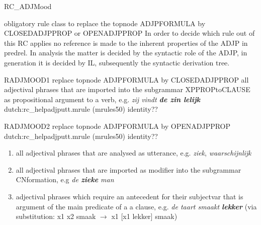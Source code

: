 \begin{mruleclass}{RC\_ADJMood}
\begin{classdescr}
\kind obligatory rule class
\classtask to replace the topnode ADJPFORMULA by CLOSEDADJPPROP or OPENADJPPROP
\classremarks 
In order to decide which rule out of this RC applies
no reference is made to the 
inherent properties of the ADJP in predrel.
In analysis the matter is decided by the syntactic role of the ADJP, in 
generation it is decided by IL, subsequently the syntactic derivation tree.
\nofilters

\nospeedrules

\noplannedrules

\norulesnotince


\end{classdescr}

\begin{members}
\begin{member}
 RADJMOOD1
 replace topnode ADJPFORMULA by CLOSEDADJPPROP
\example all adjectival phrases that are imported  into the subgrammar
XPPROPtoCLAUSE as propositional argument to a verb, e.g. {\em zij vindt {\bf 
de zin lelijk}} 
\file dutch:rc\_helpadjputt.mrule (mrules50)
\semantics identity??
\remarks\mbox{}

\end{member}

\begin{member}
 RADJMOOD2
 replace topnode ADJPFORMULA by OPENADJPPROP
\file dutch:rc\_helpadjputt.mrule (mrules50)
\semantics identity??
\example \mbox{}
\begin{enumerate}
\item
 all adjectival phrases that are analysed as utterance, e.g. {\em ziek}, {\em 
waarschijnlijk}
\item
all adjectival phrases that are imported as modifier into the subgrammar
CNformation, e.g {\em de {\bf zieke} man}
\item adjectival phrases which require an antecedent for their subjectvar
that is argument of the main predicate of a a clause, e.g.
{\em de taart smaakt {\bf lekker}} 
(via substitution: x1 x2 smaak $\rightarrow$ x1 [x1 lekker] smaak)
\end{enumerate}
\remarks\mbox{}

\end{member}
\end{members}
\end{mruleclass}

